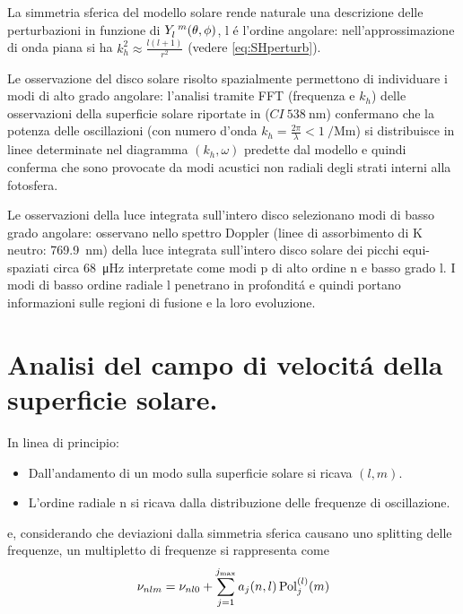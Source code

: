 \documentclass[../main.tex]{subfiles}
\begin{document}
La simmetria sferica del modello solare rende naturale una descrizione delle perturbazioni in funzione di $Y\indices{_l^m}(\theta,\phi)$, l \'e l'ordine angolare: nell'approssimazione di onda piana si ha $k_h^2\approx\frac{l(l+1)}{r^2}$ (vedere \eqref{eq:SHperturb}).


Le osservazione del disco solare risolto spazialmente permettono di individuare i modi di alto grado angolare: l'analisi tramite FFT (frequenza e $k_h$) delle osservazioni della superficie solare riportate in \citet{deu75observations} ($CI\ \SI{538}{\nano\meter}$) confermano che la  potenza delle oscillazioni (con numero d'onda $k_h=\frac{2\pi}{\lambda}<\SI{1}{\per\mega\meter}$) si distribuisce in linee determinate nel diagramma $(k_h,\omega)$ predette dal modello e quindi conferma che sono provocate da modi acustici non radiali degli strati interni alla fotosfera.

Le osservazioni della luce integrata sull'intero disco selezionano modi di basso grado angolare: \citet{cla79solar} osservano nello spettro Doppler (linee di assorbimento di K neutro: \SI{769.9}{\nano\meter}) della luce integrata sull'intero disco solare dei picchi equi-spaziati circa \SI{68}{\micro\hertz} interpretate come modi p di alto ordine n e basso grado l. I modi di basso ordine radiale l penetrano in profondit\'a e quindi portano informazioni sulle regioni di fusione e la loro evoluzione.



\section{Analisi del campo di velocit\'a della superficie solare.}

In linea di principio:

\begin{itemize}
    \item Dall'andamento di un modo sulla superficie solare si ricava $(l,m)$.
    \item L'ordine radiale n si ricava dalla distribuzione delle frequenze di oscillazione.
\end{itemize}

e, considerando che deviazioni dalla simmetria sferica causano uno splitting delle frequenze, un multipletto di frequenze si rappresenta come
\begin{equation}
\nu_{nlm}=\nu_{nl0}+\sum_{j=1}^{j_{\max}}a_j(n,l)\operatorname{Pol}_j^{(l)}(m)\label{eq:freqmulti}
\end{equation}
\end{document}
